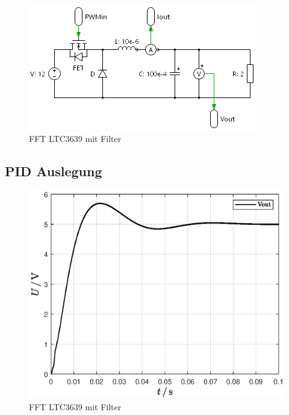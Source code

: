 \begin{figure}[H]
    \centering
    \includegraphics[width=0.8\linewidth]{Figure/SystemSoft.png}
    \caption{FFT LTC3639 mit Filter}
    \label{fig:SystemSoft}
\end{figure}


\subsection{PID Auslegung}

\begin{figure}[H]
    \centering
    \includegraphics[width=0.8\linewidth]{Figure/Soft.eps}
    \caption{FFT LTC3639 mit Filter}
    \label{fig:SystemSoft}
\end{figure}